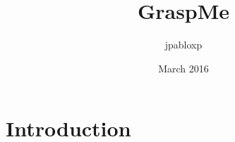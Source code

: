 \documentclass{article}
\title{GraspMe}
\author{jpabloxp }
\date{March 2016}
\begin{document}
\maketitle

\section{Introduction}
\end{document}
